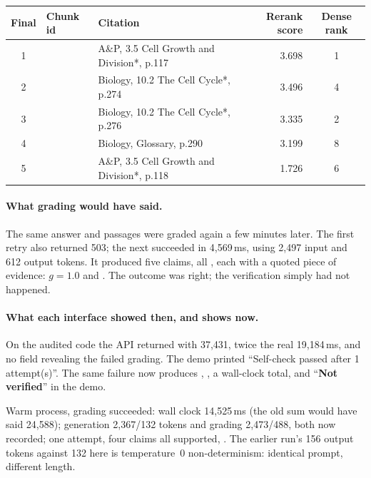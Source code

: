 \begin{center}\small
\begin{tabularx}{\textwidth}{@{}c>{\raggedright\arraybackslash}p{5.0cm}Lrc@{}}
\toprule
\textbf{Final} & \textbf{Chunk id} & \textbf{Citation} & \textbf{Rerank score} & \textbf{Dense rank}\\
 &  & A\&P, 3.5 Cell Growth and Division*, p.117 & 3.698 & 1\\
2 &  & Biology, 10.2 The Cell Cycle*, p.274 & 3.496 & 4\\
3 &  & Biology, 10.2 The Cell Cycle*, p.276 & 3.335 & 2\\
4 &  & Biology, Glossary, p.290 & 3.199 & 8\\
5 &  & A\&P, 3.5 Cell Growth and Division*, p.118 & 1.726 & 6\\
\bottomrule
\end{tabularx}
\end{center}

\paragraph{What grading would have said.} The same answer and passages were graded again a few minutes later. The first retry also returned 503; the next succeeded in 4,569\,ms, using 2,497 input and 612 output tokens. It produced five claims, all , each with a quoted piece of evidence: $g=1.0$ and . The outcome was right; the verification simply had not happened.

\paragraph{What each interface showed then, and shows now.} On the audited code the API returned  with  37,431, twice the real 19,184\,ms, and no field revealing the failed grading. The demo printed ``Self-check passed after 1 attempt(s)''. The same failure now produces , , a wall-clock total, and ``\textbf{Not verified}'' in the demo.

\begin{measured}
Warm process, grading succeeded: wall clock 14,525\,ms (the old sum would have said 24,588); generation 2,367/132 tokens and grading 2,473/488, both now recorded; one attempt, four claims all supported, . The earlier run's 156 output tokens against 132 here is temperature~0 non-determinism: identical prompt, different length.
\end{measured}

